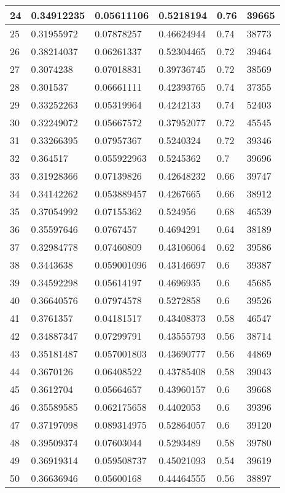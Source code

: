 \begin{longtable}{|l|l|l|l|l|l|}
24 & 0.34912235 & 0.05611106 & 0.5218194 & 0.76 & 39665 \\ \hline 
25 & 0.31955972 & 0.07878257 & 0.46624944 & 0.74 & 38773 \\ \hline 
26 & 0.38214037 & 0.06261337 & 0.52304465 & 0.72 & 39464 \\ \hline 
27 & 0.3074238 & 0.07018831 & 0.39736745 & 0.72 & 38569 \\ \hline 
28 & 0.301537 & 0.06661111 & 0.42393765 & 0.74 & 37355 \\ \hline 
29 & 0.33252263 & 0.05319964 & 0.4242133 & 0.74 & 52403 \\ \hline 
30 & 0.32249072 & 0.05667572 & 0.37952077 & 0.72 & 45545 \\ \hline 
31 & 0.33266395 & 0.07957367 & 0.5240324 & 0.72 & 39346 \\ \hline 
32 & 0.364517 & 0.055922963 & 0.5245362 & 0.7 & 39696 \\ \hline 
33 & 0.31928366 & 0.07139826 & 0.42648232 & 0.66 & 39747 \\ \hline 
34 & 0.34142262 & 0.053889457 & 0.4267665 & 0.66 & 38912 \\ \hline 
35 & 0.37054992 & 0.07155362 & 0.524956 & 0.68 & 46539 \\ \hline 
36 & 0.35597646 & 0.0767457 & 0.4694291 & 0.64 & 38189 \\ \hline 
37 & 0.32984778 & 0.07460809 & 0.43106064 & 0.62 & 39586 \\ \hline 
38 & 0.3443638 & 0.059001096 & 0.43146697 & 0.6 & 39387 \\ \hline 
39 & 0.34592298 & 0.05614197 & 0.4696935 & 0.6 & 45685 \\ \hline 
40 & 0.36640576 & 0.07974578 & 0.5272858 & 0.6 & 39526 \\ \hline 
41 & 0.3761357 & 0.04181517 & 0.43408373 & 0.58 & 46547 \\ \hline 
42 & 0.34887347 & 0.07299791 & 0.43555793 & 0.56 & 38714 \\ \hline 
43 & 0.35181487 & 0.057001803 & 0.43690777 & 0.56 & 44869 \\ \hline 
44 & 0.3670126 & 0.06408522 & 0.43785408 & 0.58 & 39043 \\ \hline 
45 & 0.3612704 & 0.05664657 & 0.43960157 & 0.6 & 39668 \\ \hline 
46 & 0.35589585 & 0.062175658 & 0.4402053 & 0.6 & 39396 \\ \hline 
47 & 0.37197098 & 0.089314975 & 0.52864057 & 0.6 & 39120 \\ \hline 
48 & 0.39509374 & 0.07603044 & 0.5293489 & 0.58 & 39780 \\ \hline 
49 & 0.36919314 & 0.059508737 & 0.45021093 & 0.54 & 39619 \\ \hline 
50 & 0.36636946 & 0.05600168 & 0.44464555 & 0.56 & 38897 \\ \hline 
\end{longtable}